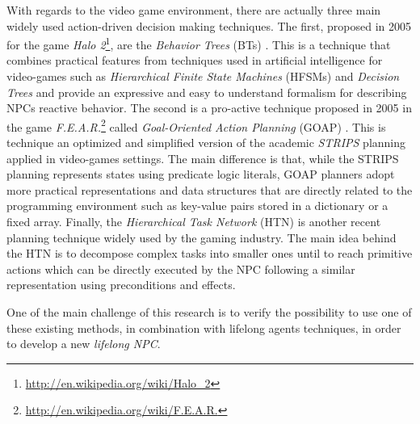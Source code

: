 With regards to the video game environment, there are actually three main widely used action-driven decision making techniques. The first, proposed in 2005 for the game \emph{Halo 2}\footnote{\url{http://en.wikipedia.org/wiki/Halo_2}}, are the \emph{Behavior Trees} (BTs) \cite{Isla05BehaviorTrees}. This is a technique that combines practical features from techniques used in artificial intelligence for video-games such as \emph{Hierarchical Finite State Machines} (HFSMs)  and \emph{Decision Trees} and provide an expressive and easy to understand formalism for describing NPCs reactive behavior. The second is a pro-active technique proposed in 2005 in the game \emph{F.E.A.R.}\footnote{\url{http://en.wikipedia.org/wiki/F.E.A.R.}} called \emph{Goal-Oriented Action Planning} (GOAP) \cite{orkin06fear}. This is technique an optimized and simplified version of the academic \emph{STRIPS} planning applied in video-games settings. The main difference is that, while the STRIPS \cite{fikes1972strips} planning represents states using predicate logic literals, GOAP planners adopt more practical representations and data structures that are directly related to the programming environment such as key-value pairs stored in a dictionary or a fixed array.
Finally, the \emph{Hierarchical Task Network} (HTN) \cite{DBLP:conf/ijcai/Sacerdoti75} \cite{htn94complexity} is another recent planning technique widely used by the gaming industry. The main idea behind the HTN is to decompose complex tasks into smaller ones until to reach primitive actions which can be directly executed by the NPC following a similar representation using preconditions and effects.

One of the main challenge of this research is to verify the possibility to use one of these existing methods, in combination with lifelong agents techniques, in order to develop a new \emph{lifelong NPC}.


